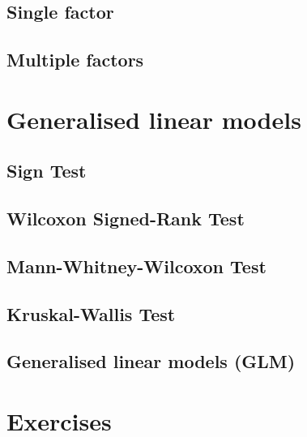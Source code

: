 \documentclass[english,10pt,a4paper,oneside]{book}
\begin{document}
\hypertarget{single-factor-2}{%
\subsection{Single factor}\label{single-factor-2}}

\hypertarget{multiple-factors-2}{%
\subsection{Multiple factors}\label{multiple-factors-2}}

\hypertarget{generalised-linear-models}{%
\section{Generalised linear models}\label{generalised-linear-models}}

\hypertarget{sign-test}{%
\subsection{Sign Test}\label{sign-test}}

\hypertarget{wilcoxon-signed-rank-test}{%
\subsection{Wilcoxon Signed-Rank Test}\label{wilcoxon-signed-rank-test}}

\hypertarget{mann-whitney-wilcoxon-test}{%
\subsection{Mann-Whitney-Wilcoxon Test}\label{mann-whitney-wilcoxon-test}}

\hypertarget{kruskal-wallis-test}{%
\subsection{Kruskal-Wallis Test}\label{kruskal-wallis-test}}

\hypertarget{generalised-linear-models-glm}{%
\subsection{Generalised linear models (GLM)}\label{generalised-linear-models-glm}}

\hypertarget{exercises-8}{%
\section{Exercises}\label{exercises-8}}
\end{document}
